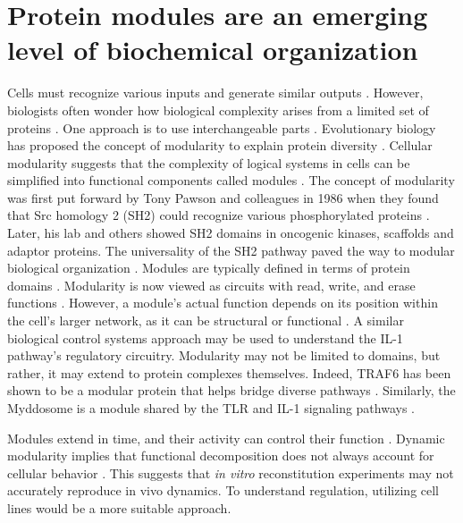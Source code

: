 \section{Protein modules are an emerging level of biochemical organization}
\label{section:modularity}
Cells must recognize various inputs and generate similar outputs \autocite{Alberts_2002}. However, biologists often wonder how biological complexity arises from a limited set of proteins \autocite{Hyman_2011}. One approach is to use interchangeable parts \autocite{Alcala-Corona_2021}. Evolutionary biology has proposed the concept of modularity to explain protein diversity \autocite{Wagner_2007}. Cellular modularity suggests that the complexity of logical systems in cells can be simplified into functional components called modules \autocite{Alcala-Corona_2021}. The concept of modularity was first put forward by Tony Pawson and colleagues in 1986 when they found that Src homology 2 (SH2) could recognize various phosphorylated proteins \autocite{Sadowski_1986}. Later, his lab and others showed SH2 domains in oncogenic kinases, scaffolds and adaptor proteins. The universality of the SH2 pathway paved the way to modular biological organization \autocite{Scott_2013}. Modules are typically defined in terms of protein domains \autocite{Pawson_1995}\autocite{Bashton_2007}. Modularity is now viewed as circuits with read, write, and erase functions \autocite{Mayer_2017}. However, a module’s actual function depends on its position within the cell’s larger network, as it can be structural or functional \autocite{DelVecchio_2015}\autocite{Dobay_2018}. A similar biological control systems approach may be used to understand the IL-1 pathway's regulatory circuitry. Modularity may not be limited to domains, but rather, it may extend to protein complexes themselves. Indeed, TRAF6 has been shown to be a modular protein that helps bridge diverse pathways \autocite{Wu_2003}\autocite{Naismith_1998}. Similarly, the Myddosome is a module shared by the TLR and IL-1 signaling pathways \autocite{Rosadini_2015}.
 
Modules extend in time, and their activity can control their function \autocite{Callebaut_2005}. Dynamic modularity implies that functional decomposition does not always account for cellular behavior \autocite{Slusarczyk_2012}. This suggests that \emph{in vitro} reconstitution experiments may not accurately reproduce in vivo dynamics. To understand regulation, utilizing cell lines would be a more suitable approach.
 

